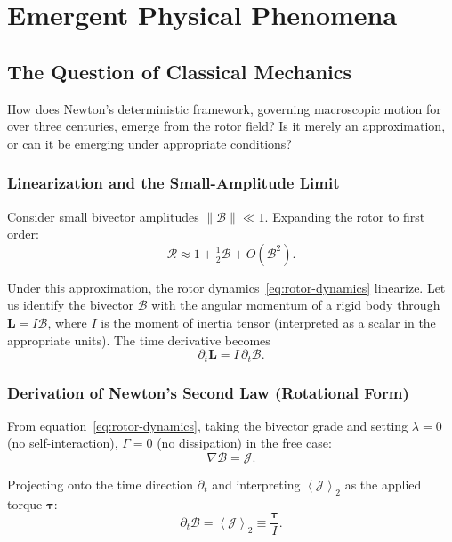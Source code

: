 \documentclass[11pt,a4paper]{article}
\newcommand{\grade}[2]{\left\langle #1 \right\rangle_{#2}}
\newcommand{\biv}[1]{\grade{#1}{2}}
\newcommand{\Rotor}{\mathcal{R}}
\newcommand{\Biv}{\mathcal{B}}
\newcommand{\D}{\nabla}                        %
\theoremstyle{definition}
\theoremstyle{plain}
\theoremstyle{remark}
\begin{document}
\vspace{1em}

\section{Emergent Physical Phenomena}\label{sec:emergent}

\subsection{The Question of Classical Mechanics}

How does Newton's deterministic framework, governing macroscopic motion for over three centuries, emerge from the rotor field? Is it merely an approximation, or can it be emerging under appropriate conditions?

\subsubsection{Linearization and the Small-Amplitude Limit}

Consider small bivector amplitudes $\|\Biv\| \ll 1$. Expanding the rotor to first order:
\begin{equation}
\Rotor \approx 1 + \tfrac{1}{2}\Biv + O(\Biv^2).
\end{equation}

Under this approximation, the rotor dynamics~\eqref{eq:rotor-dynamics} linearize. Let us identify the bivector $\Biv$ with the angular momentum of a rigid body through $\bm{L} = I\Biv$, where $I$ is the moment of inertia tensor (interpreted as a scalar in the appropriate units). The time derivative becomes
\begin{equation}
\partial_t \bm{L} = I\, \partial_t \Biv.
\end{equation}

\subsubsection{Derivation of Newton's Second Law (Rotational Form)}

From equation~\eqref{eq:rotor-dynamics}, taking the bivector grade and setting $\lambda=0$ (no self-interaction), $\Gamma=0$ (no dissipation) in the free case:
\begin{equation}
\D \Biv = \mathcal{J}.
\end{equation}

Projecting onto the time direction $\partial_t$ and interpreting $\biv{\mathcal{J}}$ as the applied torque $\bm{\tau}$:
\begin{equation}
\partial_t \Biv = \biv{\mathcal{J}} \equiv \frac{\bm{\tau}}{I}.
\end{equation}
\end{document}
